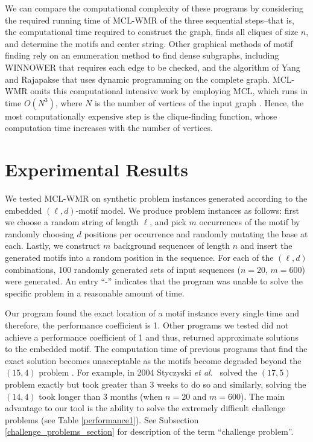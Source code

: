 We can compare the computational complexity of these programs by considering the required running time of MCL-WMR of the three sequential steps--that is, the computational time required to construct the graph, finds all cliques of size $n$, and determine the motifs and center string.  Other graphical methods of motif finding rely on an enumeration method to find dense subgraphs, including WINNOWER that requires each edge to be checked, and the algorithm of Yang and Rajapakse that uses dynamic programming on the complete graph. MCL-WMR omits this computational intensive work by employing MCL, which runs in time $O(N^3)$, where $N$ is the number of vertices of the input graph \cite{vD00}.  Hence, the most computationally expensive step is the clique-finding function, whose computation time increases with the number of vertices.

\section{Experimental Results}

We tested MCL-WMR on synthetic problem instances generated according to the embedded $(\ell, d)$-motif model. We produce problem instances as follows: first we choose a random string of length $\ell$, and pick $m$ occurrences of the motif by randomly choosing $d$ positions per occurrence and randomly mutating the base at each.  Lastly, we construct $m$ background sequences of length $n$ and insert the generated motifs into a random position in the sequence.  For each of the $(\ell,d)$ combinations, 100 randomly generated sets of input sequences ($n = 20$, $m = 600$) were generated.  An entry ``-'' indicates that the program was unable to solve the specific problem in a reasonable amount of time.
 
Our program found the exact location of a motif instance every single time and therefore, the performance coefficient is 1.  Other programs we tested did not achieve a performance coefficient of 1 and thus, returned approximate solutions to the embedded motif. The computation time of previous programs that find the exact solution becomes unacceptable as the motifs become degraded beyond the $(15,4)$ problem \cite{SJ04}.  For example, in 2004 Styczyski {\em et al.}\ \cite{SJ04} solved the $(17,5)$ problem exactly but took  greater than 3 weeks to do so and similarly, solving the $(14,4)$ took longer than 3 months (when $n = 20$ and $m = 600$).  The main advantage to our tool is the ability to solve the extremely difficult challenge problems (see Table \ref{performance1}).  See Subsection \ref{challenge_problems_section} for description of the term ``challenge problem''.


